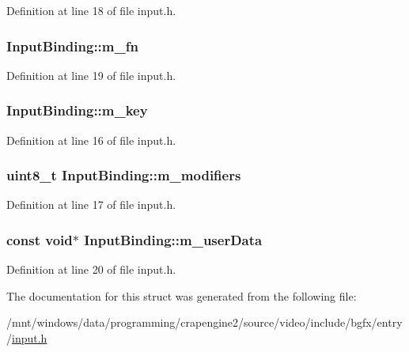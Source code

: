 Definition at line 18 of file input.\+h.

\hypertarget{struct_input_binding_af6ba3f6ea52ac588cc30d28328cc004e}{
\subsubsection[{m\+\_\+fn}]{ Input\+Binding\+::m\+\_\+fn}}\label{struct_input_binding_af6ba3f6ea52ac588cc30d28328cc004e}


Definition at line 19 of file input.\+h.

\hypertarget{struct_input_binding_af3b1d9074e72dc711caa33ea5bb964d1}{
\subsubsection[{m\+\_\+key}]{ Input\+Binding\+::m\+\_\+key}}\label{struct_input_binding_af3b1d9074e72dc711caa33ea5bb964d1}


Definition at line 16 of file input.\+h.

\hypertarget{struct_input_binding_a15a1fd933f0304996536b7979d3c3fab}{
\subsubsection[{m\+\_\+modifiers}]{\setlength{\rightskip}{0pt plus 5cm}uint8\+\_\+t Input\+Binding\+::m\+\_\+modifiers}}\label{struct_input_binding_a15a1fd933f0304996536b7979d3c3fab}


Definition at line 17 of file input.\+h.

\hypertarget{struct_input_binding_acdadb3240faeaa025822321b2ea56b6e}{
\subsubsection[{m\+\_\+user\+Data}]{\setlength{\rightskip}{0pt plus 5cm}const void$\ast$ Input\+Binding\+::m\+\_\+user\+Data}}\label{struct_input_binding_acdadb3240faeaa025822321b2ea56b6e}


Definition at line 20 of file input.\+h.



The documentation for this struct was generated from the following file\+:\begin{DoxyCompactItemize}
\item 
/mnt/windows/data/programming/crapengine2/source/video/include/bgfx/entry/\hyperlink{input_8h}{input.\+h}\end{DoxyCompactItemize}
